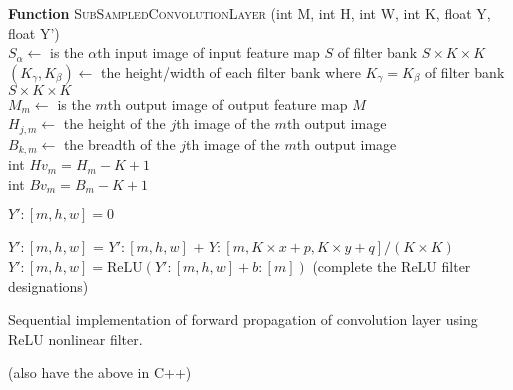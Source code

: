 \documentclass[7pt]{article}
\begin{document}
\begin{algorithm}
	\vspace{0.1in}
	{\textbf{Function} \textsc{SubSampledConvolutionLayer} (int M,  int H, int W, int K, float Y, float Y')}\\
	\vspace{0.05in}
	$S_{\alpha} \leftarrow$ is the $\alpha$th input image of input feature map $S$ of filter bank $S \times K \times K$\\
	$(K_{\gamma}, K_{\beta})  \leftarrow$ the height/width of each filter bank where $K_{\gamma} = K_{\beta}$ of filter bank $S \times K \times K$\\
	$M_m \leftarrow$ is the $m$th output image of output feature map $M$\\
	$H_{j,m} \leftarrow$ the height of the $j$th image of the $m$th output image\\
	$B_{k,m} \leftarrow$ the breadth of the $j$th image of the $m$th output image\\
	\vspace{0.05in}
	int $Hv_{m} = H_{m} - K  + 1$ \\
	int $Bv_{m} = B_{m} - K  + 1$
	
	\vspace{0.05in}
	{
		{
			{
				$Y' : [m,h,w] = 0$
		
					{
						{
							{$Y':[m,h,w]$} = {$Y':[m,h,w]$}  +  {$Y:[m,K \times x + p,K \times y + q]/(K \times K)$}  
						}
					}
				{$Y':[m,h,w] = \text{ReLU} (Y':[m,h,w]  + b:[m])$} 
				(complete the ReLU filter designations)
			}
		}
	}
	
	\caption{Sequential implementation of forward propagation of convolution layer using ReLU nonlinear filter.}
\end{algorithm}
(also have the above in C++)
\end{document}
